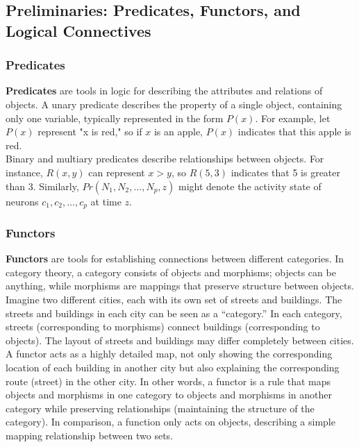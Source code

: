 \documentclass[11p,oneside]{book}
\begin{document}
\subsection*{Preliminaries: Predicates, Functors, and Logical Connectives}

\subsubsection*{Predicates}

\textbf{Predicates} are tools in logic for describing the attributes and relations of objects. A unary predicate describes the property of a single object, containing only one variable, typically represented in the form $P(x)$. For example, let $P(x)$ represent "x is red," so if $x$ is an apple, $P(x)$ indicates that this apple is red. 
\\

Binary and multiary predicates describe relationships between objects. For instance, $R(x, y)$ can represent $x > y$, so $R(5, 3)$ indicates that 5 is greater than 3. Similarly, $Pr(N_1, N_2, \ldots, N_p, z)$ might denote the activity state of neurons $c_1, c_2, \ldots, c_p$ at time $z$.

\subsubsection*{Functors}

\textbf{Functors} are tools for establishing connections between different categories. In category theory, a category consists of objects and morphisms; objects can be anything, while morphisms are mappings that preserve structure between objects. Imagine two different cities, each with its own set of streets and buildings. The streets and buildings in each city can be seen as a “category.” In each category, streets (corresponding to morphisms) connect buildings (corresponding to objects). The layout of streets and buildings may differ completely between cities.
\\

A functor acts as a highly detailed map, not only showing the corresponding location of each building in another city but also explaining the corresponding route (street) in the other city. In other words, a functor is a rule that maps objects and morphisms in one category to objects and morphisms in another category while preserving relationships (maintaining the structure of the category). In comparison, a function only acts on objects, describing a simple mapping relationship between two sets.
\\
\end{document}
